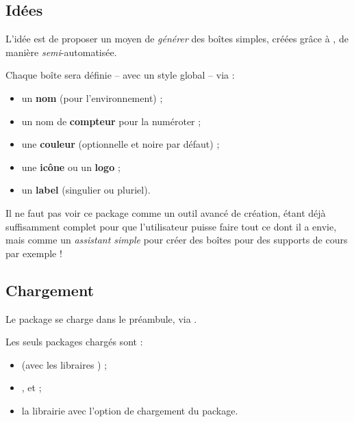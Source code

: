 \documentclass[french,11pt,a4paper]{article}
\begin{document}
\subsection{Idées}

L'idée est de proposer un moyen de \textit{générer} des boîtes simples, créées grâce à , de manière \textit{semi}-automatisée.

\smallskip

Chaque boîte sera définie -- avec un style global -- via :

\begin{itemize}
	\item un \textbf{nom} (pour l'environnement) ;
	\item un nom de \textbf{compteur} pour la numéroter ;
	\item une \textbf{couleur} (optionnelle et noire par défaut) ;
	\item une \textbf{icône} ou un \textbf{logo} ;
	\item un \textbf{label} (singulier ou pluriel).
\end{itemize}

\medskip

Il ne faut pas voir ce package comme un outil avancé de création,  étant déjà suffisamment complet pour que l'utilisateur puisse faire tout ce dont il a envie, mais comme un \textit{assistant simple} pour créer des boîtes pour des supports de cours par exemple !

\subsection{Chargement}

Le package se charge dans le préambule, via .

Les seuls packages chargés sont :

\begin{itemize}
	\item {} (avec les libraires ) ;
	\item {},  et  ;
	\item la librairie  avec l'option \MontreCode{[breakable]} de chargement du package.
\end{itemize}

\begin{codehigh}[language=latex/latex2,style/main=cyan!10,style/code=cyan!10]
\usepackage{CreationBoites}                    %
\usepackage[breakable]{CreationBoites}         %
\end{codehigh}
\end{document}

